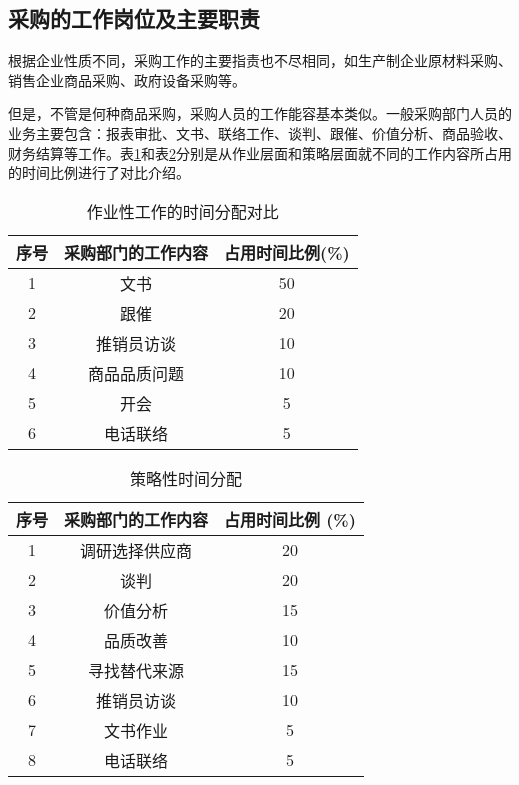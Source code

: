 \subsection {采购的工作岗位及主要职责}

    根据企业性质不同，采购工作的主要指责也不尽相同，如生产制企业原材料采购、销售企业商品采购、政府设备采购等。

    但是，不管是何种商品采购，采购人员的工作能容基本类似。一般采购部门人员的业务主要包含：报表审批、文书、联络工作、谈判、跟催、价值分析、商品验收、财务结算等工作。表\ref{tab:workingTimeAlloc}和表\ref{tab:strategyTimeAlloc}分别是从作业层面和策略层面就不同的工作内容所占用的时间比例进行了对比介绍。

    \begin{table}[bcht]
        \centering
        \begin{tabular}{c|c|c}
            \hline
            序号 & 采购部门的工作内容 & 占用时间比例(\%) \\ \hline
            1 & 文书 & 50 \\ \hline
            2 & 跟催 & 20 \\ \hline
            3 & 推销员访谈 & 10 \\ \hline
            4 & 商品品质问题 & 10 \\ \hline
            5 & 开会 & 5 \\ \hline
            6 & 电话联络 & 5 \\ \hline
        \end{tabular}
        \caption{作业性工作的时间分配对比} \label{tab:workingTimeAlloc}
    \end{table}

    \begin{table}[bcht]
        \centering
        \begin{tabular}{c|c|c}
            \hline
            序号 & 采购部门的工作内容 & 占用时间比例 (\%) \\ \hline
            1 & 调研选择供应商 & 20 \\ \hline
            2 & 谈判 & 20 \\ \hline
            3 & 价值分析 & 15 \\ \hline
            4 & 品质改善 & 10 \\ \hline
            5 & 寻找替代来源 & 15 \\ \hline
            6 & 推销员访谈 & 10 \\ \hline
            7 & 文书作业 & 5 \\ \hline
            8 & 电话联络 & 5 \\ \hline
        \end{tabular}
        \caption{策略性时间分配} \label{tab:strategyTimeAlloc}
    \end{table}

